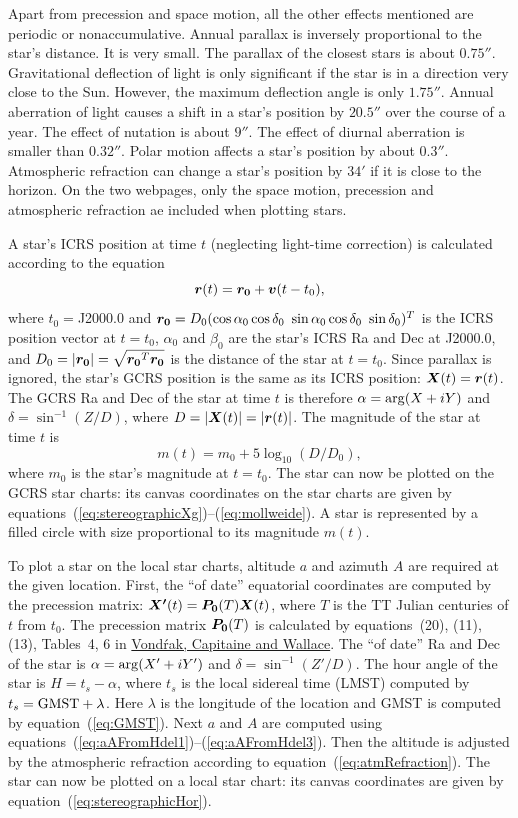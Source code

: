 \documentclass[12pt]{article}
\newcommand \beq {\begin{equation}}
\newcommand \eeq {\end{equation}}
\newcommand{\ve}[1]{\mbox{\boldmath $#1$}}
\begin{document}
Apart from precession and space motion, all the other effects mentioned 
are periodic or nonaccumulative. Annual parallax is 
inversely proportional to the star's distance. It is very small. The parallax 
of the closest stars is about $0.75''$. Gravitational deflection of light is 
only significant if the star is in a direction very close to the Sun. However, 
the maximum deflection angle is only $1.75''$. Annual aberration of light causes a shift 
in a star's position by $20.5''$ over the course of a year. The effect of 
nutation is about $9''$. The effect of diurnal aberration is smaller than $0.32''$. Polar 
motion affects a star's position by about $0.3''$. Atmospheric refraction 
can change a star's position by $34'$ if it is close to the horizon. 
On the two webpages, only the space motion, precession and atmospheric 
refraction ae included when plotting stars.

A star's ICRS position at time $t$ (neglecting light-time correction) 
is calculated according to the equation 
\beq
  \ve{r}(t) = \ve{r_0} + \ve{v} (t-t_0) ,
\eeq
where $t_0=$J2000.0 and $\ve{r_0} = D_0 (\cos \alpha_0 \cos \delta_0\ 
\sin \alpha_0 \cos \delta_0\ \sin \delta_0)^T$ is the ICRS position 
vector at $t=t_0$, $\alpha_0$ and $\beta_0$ are the star's ICRS Ra and Dec 
at J2000.0, and $D_0=|\ve{r_0}|=\sqrt{\ve{r_0}^T \ve{r_0}}$ is the distance 
of the star at $t=t_0$. Since parallax is ignored, the star's GCRS position 
is the same as its ICRS position: $\ve{X}(t)=\ve{r}(t)$. The GCRS Ra and Dec 
of the star at time $t$ is therefore $\alpha = {\rm arg}(X+iY)$ and 
$\delta = \sin^{-1} (Z/D)$, where $D=|\ve{X}(t)|=|\ve{r}(t)|$. The 
magnitude of the star at time $t$ is 
\beq
  m(t) = m_0 + 5\log_{10}(D/D_0) ,
\eeq
where $m_0$ is the star's magnitude at $t=t_0$. The star can now be 
plotted on the GCRS star charts: its canvas coordinates on the 
star charts are given by equations~(\ref{eq:stereographicXg})--(\ref{eq:mollweide}).  
A star is represented by a filled circle with size proportional to its 
magnitude $m(t)$.

To plot a star on the local star charts, altitude $a$ 
and azimuth $A$ are required at the given location. First, the ``of date'' equatorial 
coordinates are computed by the precession matrix: $\ve{X'}(t)=\ve{P_0}(T)\ve{X}(t)$, 
where $T$ is the TT Julian centuries of $t$ from $t_0$. The precession matrix 
$\ve{P_0}(T)$ is calculated by equations~(20), (11), (13), Tables~4, 6 in
\href{http://adsabs.harvard.edu/abs/2011A%26A...534A..22V}{Vond\'rak, Capitaine and Wallace}.
The ``of date'' Ra and Dec 
of the star is $\alpha = {\rm arg}(X'+iY')$ and $\delta=\sin^{-1} (Z'/D)$. 
The hour angle of the star is $H=t_s-\alpha$, where $t_s$ is the local 
sidereal time (LMST) computed by $t_s = {\rm GMST}+\lambda$. 
Here $\lambda$ is the longitude of the location and GMST is computed 
by equation~(\ref{eq:GMST}). Next $a$ and $A$ are computed using 
equations~(\ref{eq:aAFromHdel1})--(\ref{eq:aAFromHdel3}). Then the altitude 
is adjusted by the atmospheric refraction according to equation~(\ref{eq:atmRefraction}). 
The star can now be plotted on a local star chart: its canvas coordinates are 
given by equation~(\ref{eq:stereographicHor}).
\end{document}
